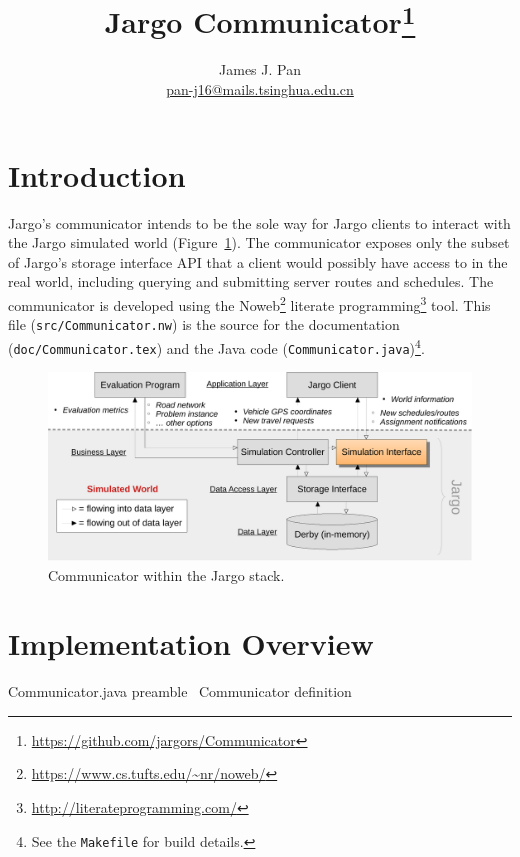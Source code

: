 \documentclass{article}
\title{Jargo Communicator\footnote{
  \url{https://github.com/jargors/Communicator}}}
\author{James J. Pan\\
  \small{\href{mailto:pan-j16@mails.tsinghua.edu.cn}{pan-j16@mails.tsinghua.edu.cn}}}
\def\nwendcode{\endtrivlist \endgroup}      %
\let\nwdocspar=\par
\begin{document}
\maketitle
\pagestyle{noweb}

\tableofcontents

\section{Introduction}
\label{sec:introduction}
Jargo's communicator intends to be the sole way for Jargo clients to interact
with the Jargo simulated world (Figure~\ref{fig:interface-fig}). The
communicator exposes only the subset of Jargo's storage interface API that a
client would possibly have access to in the real world, including querying and
submitting server routes and schedules.  The communicator is developed using
the Noweb\footnote{\url{https://www.cs.tufts.edu/~nr/noweb/}} literate
programming\footnote{\url{http://literateprogramming.com/}} tool.  This file
({\tt{}src/Communicator.nw}) is the source for the documentation
({\tt{}doc/Communicator.tex}) and the Java code
({\tt{}Communicator.java})\footnote{See the {\tt{}Makefile} for build details.}.

\begin{figure}[h]
\centering
\includegraphics[width=150mm]{src/fig/interface-fig}
\caption{Communicator within the Jargo stack.}
\label{fig:interface-fig}
\end{figure}

\section{Implementation Overview}
\label{sec:implementation-overview}
\endmoddef{}
\LA{}Communicator.java preamble~{\nwtagstyle{}}\RA{}
\LA{}\code{}Communicator\edoc{} definition~{\nwtagstyle{}}\RA{}
\nwendcode{}\nwdocspar
\end{document}
